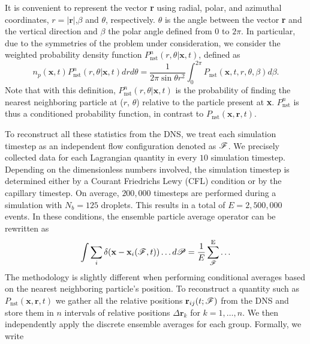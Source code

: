 It is convenient to represent the vector \textbf{r} using radial, polar, and azimuthal coordinates,  $r = |\textbf{r}|$,$\beta$ and $\theta$, respectively. $\theta$ is the angle between the vector \textbf{r} and the vertical direction and $\beta$ the polar angle defined from $0$ to $2\pi$. In particular, due to the symmetries of the problem under consideration, we consider the weighted probability density function $P_\text{nst}^n(r,\theta|\textbf{x},t)$, defined as\begin{equation}
    n_p(\textbf{x},t) P_\text{nst}^n(r,\theta|\textbf{x},t)dr d\theta 
    =\frac{1}{2\pi \sin\theta r^2 }
    \int_0^{2\pi}
    P_\text{nst}(\textbf{x},t,r,\theta,\beta) 
    d\beta.
    \label{eq:Ptheta_r}
\end{equation}
Note that with this definition, $P_\text{nst}^n(r,\theta|\textbf{x},t)$ is the probability of finding the nearest neighboring particle at ($r$, $\theta$) relative to the particle present at \textbf{x}. 
$P_\text{nst}^n$ is thus a conditioned probability function, in contrast to $P_\text{nst}(\textbf{x},\textbf{r},t)$. 

To reconstruct all these statistics from the DNS, we treat each simulation timestep as an independent flow configuration denoted as $\mathscr{F}$. 
We precisely collected data for each Lagrangian quantity in every $10$ simulation timestep. 
Depending on the dimensionless numbers involved, the simulation timestep is determined either by a Courant Friedrichs Lewy (CFL) condition or by the capillary timestep.
On average, $200,000$ timesteps are performed during a simulation with $N_b = 125$ droplets. 
This results in a total of $E = 2,500,000$ events. 
In these conditions, the ensemble particle average operator can be rewritten as
\begin{equation}
    \int \sum_i \delta(\textbf{x}-\textbf{x}_i(\mathscr{F},t)) \ldots d\mathscr{P}
    = \frac{1}{E}\sum_{\mathscr{F}}^\text{E} \ldots 
    \label{eq:discrete_ensemble_average}
\end{equation}  
The methodology is slightly different when performing conditional averages based on the nearest neighboring particle's position. 
To reconstruct a quantity such as $P_\text{nst}(\textbf{x},\textbf{r},t)$ we gather all the relative positions $\textbf{r}_{ij}(t;\mathscr{F})$ from the DNS and store them in $n$ intervals of relative positions $\Delta \textbf{r}_k$ for $k = 1,\ldots, n$.
We then independently apply the discrete ensemble averages for each group.
Formally, we write

